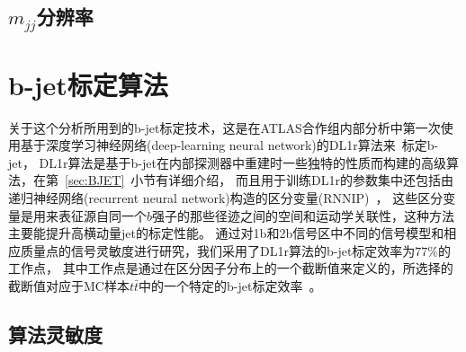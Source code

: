  
 
\subsection{$m_{jj}$分辨率}
\label{sec:DijetMjjBin}




\section{b-jet标定算法}
\label{sec:DijetBtagging}

关于这个分析所用到的b-jet标定技术，这是在ATLAS合作组内部分析中第一次使用基于深度学习神经网络(deep-learning neural network)的DL1r算法来~\cite{DLOR1,DLOR2}标定b-jet，
DL1r算法是基于b-jet在内部探测器中重建时一些独特的性质而构建的高级算法，在第~\ref{sec:BJET}~小节有详细介绍，
而且用于训练DL1r的参数集中还包括由递归神经网络(recurrent neural network)构造的区分变量(RNNIP)~\cite{ATL-PHYS-PUB-2017-003}，
这些区分变量是用来表征源自同一个$b$强子的那些径迹之间的空间和运动学关联性，这种方法主要能提升高横动量jet的标定性能。
通过对1b和2b信号区中不同的信号模型和相应质量点的信号灵敏度进行研究，我们采用了DL1r算法的b-jet标定效率为$77\%$的工作点，
其中工作点是通过在区分因子分布上的一个截断值来定义的，所选择的截断值对应于MC样本$t\bar{t}$中的一个特定的b-jet标定效率~\cite{ATL-PHYS-PUB-2017-013}。

\subsection{算法灵敏度}
\label{sec:DijetBtagging1}

